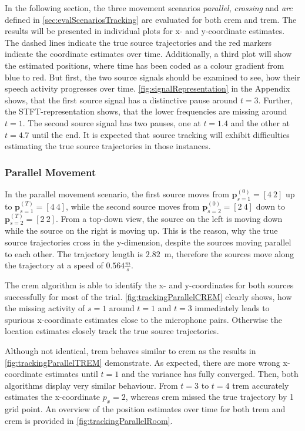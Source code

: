 In the following section, the three movement scenarios \emph{parallel}, \emph{crossing} and \emph{arc} defined in \autoref{sec:evalScenariosTracking} are evaluated for both \gls{crem} and \gls{trem}. The results will be presented in individual plots for x- and y-coordinate estimates. The dashed lines indicate the true source trajectories and the red markers indicate the coordinate estimates over time. Additionally, a third plot will show the estimated positions, where time has been coded as a colour gradient from blue to red. But first, the two source signals should be examined to see, how their speech activity progresses over time. \autoref{fig:signalRepresentation} in the Appendix shows, that the first source signal has a distinctive pause around $t=3$. Further, the STFT-representation shows, that the lower frequencies are missing around $t=1$. The second source signal has two pauses, one at $t=1.4$ and the other at $t=4.7$ until the end. It is expected that source tracking will exhibit difficulties estimating the true source trajectories in those instances.

\subsubsection*{Parallel Movement}
In the parallel movement scenario, the first source moves from $\bm p^{(0)}_{s=1}=[4~2]$ up to $\bm p^{(T)}_{s=1}=[4~4]$, while the second source moves from $\bm p^{(0)}_{s=2}=[2~4]$ down to $\bm p^{(T)}_{s=2}=[2~2]$. From a top-down view, the source on the left is moving down while the source on the right is moving up. This is the reason, why the true source trajectories cross in the y-dimension, despite the sources moving parallel to each other. The trajectory length is $2.82$~m, therefore the sources move along the trajectory at a speed of $0.564\frac{m}{s}$. 



The \gls{crem} algorithm is able to identify the x- and y-coordinates for both sources successfully for most of the trial. \autoref{fig:trackingParallelCREM} clearly shows, how the missing activity of $s=1$ around $t=1$ and $t=3$ immediately leads to spurious x-coordinate estimates close to the microphone pairs. Otherwise the location estimates closely track the true source trajectories.




Although not identical, \gls{trem} behaves similar to \gls{crem} as the results in \autoref{fig:trackingParallelTREM} demonstrate. As expected, there are more wrong x-coordinate estimates until $t=1$ and the variance has fully converged. Then, both algorithms display very similar behaviour. From $t=3$ to $t=4$ \gls{trem} accurately estimates the x-coordinate $p_x=2$, whereas \gls{crem} missed the true trajectory by 1 grid point. An overview of the position estimates over time for both \gls{trem} and \gls{crem} is provided in \autoref{fig:trackingParallelRoom}.

